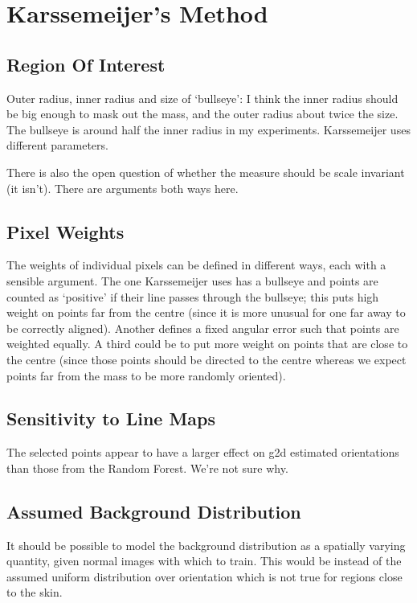 \section{Karssemeijer's Method}
\subsection{Region Of Interest}
Outer radius, inner radius and size of `bullseye': I think the inner radius should be big enough to mask out the mass, and the outer radius about twice the size. The bullseye is around half the inner radius in my experiments. Karssemeijer uses different parameters.

There is also the open question of whether the measure should be scale invariant (it isn't). There are arguments both ways here.

\subsection{Pixel Weights}
The weights of individual pixels can be defined in different ways, each with a sensible argument. The one Karssemeijer uses has a bullseye and points are counted as `positive' if their line passes through the bullseye; this puts high weight on points far from the centre (since it is more unusual for one far away to be correctly aligned). Another defines a fixed angular error such that points are weighted equally. A third could be to put more weight on points that are close to the centre (since those points should be directed to the centre whereas we expect points far from the mass to be more randomly oriented).

\subsection{Sensitivity to Line Maps}
The selected points appear to have a larger effect on g2d estimated orientations than those from the Random Forest. We're not sure why.

\subsection{Assumed Background Distribution}
It should be possible to model the background distribution as a spatially varying quantity, given normal images with which to train. This would be instead of the assumed uniform distribution over orientation which is not true for regions close to the skin.
